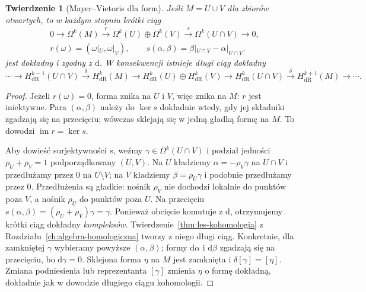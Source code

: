 \documentclass[11pt,a4paper,oneside]{report}
\newcommand{\dd}{\mathrm d}
\theoremstyle{plain}
\newtheorem{twierdzenie}{Twierdzenie}[section]
\theoremstyle{definition}
\theoremstyle{remark}
\begin{document}
\begin{twierdzenie}[Mayer--Vietoris dla form]
\label{thm:mv-de-rham}
Jeśli $M=U\cup V$ dla zbiorów otwartych, to
w każdym stopniu krótki ciąg
\begin{equation}\label{eq:mv-formy-kompleks}
\begin{gathered}
0\to\Omega^k(M)\xrightarrow{\ r\ }
\Omega^k(U)\oplus\Omega^k(V)
\xrightarrow{\ s\ }\Omega^k(U\cap V)\to0,\\
r(\omega)=(\omega|_U,\omega|_V),\qquad
s(\alpha,\beta)=\beta|_{U\cap V}-\alpha|_{U\cap V}.
\end{gathered}
\end{equation}
jest dokładny i zgodny z $\dd$. W konsekwencji
istnieje długi ciąg dokładny
\[
 \cdots\to H^{k-1}_{\mathrm{dR}}(U\cap V)
 \xrightarrow{\delta}H^k_{\mathrm{dR}}(M)
 \to H^k_{\mathrm{dR}}(U)\oplus H^k_{\mathrm{dR}}(V)
 \to H^k_{\mathrm{dR}}(U\cap V)
 \xrightarrow{\delta}H^{k+1}_{\mathrm{dR}}(M)\to\cdots.
\]
\end{twierdzenie}
\begin{proof}
Jeżeli $r(\omega)=0$, forma znika na $U$ i $V$,
więc znika na $M$: $r$ jest iniektywne.
Para $(\alpha,\beta)$ należy do $\ker s$ dokładnie
wtedy, gdy jej składniki zgadzają się na przecięciu;
wówczas sklejają się w jedną gładką formę na $M$.
To dowodzi $\operatorname{im}r=\ker s$.

Aby dowieść surjektywności $s$, weźmy
$\gamma\in\Omega^k(U\cap V)$ i podział jedności
$\rho_U+\rho_V=1$ podporządkowany $(U,V)$.
Na $U$ kładziemy $\alpha=-\rho_V\gamma$ na
$U\cap V$ i przedłużamy przez $0$ na $U\setminus V$;
na $V$ kładziemy $\beta=\rho_U\gamma$
i podobnie przedłużamy przez $0$.
Przedłużenia są gładkie: nośnik $\rho_V$ nie
dochodzi lokalnie do punktów poza $V$, a nośnik
$\rho_U$ do punktów poza $U$. Na przecięciu
$s(\alpha,\beta)=(\rho_U+\rho_V)\gamma=\gamma$.
Ponieważ obcięcie komutuje z $\dd$, otrzymujemy
krótki ciąg dokładny \emph{kompleksów}.
Twierdzenie~\ref{thm:les-kohomologia} z
Rozdziału~\ref{ch:algebra-homologiczna} tworzy
z niego długi ciąg. Konkretnie, dla zamkniętej
$\gamma$ wybieramy powyższe $(\alpha,\beta)$;
formy $\dd\alpha$ i $\dd\beta$ zgadzają się
na przecięciu, bo $\dd\gamma=0$. Sklejona
forma $\eta$ na $M$ jest zamknięta i
$\delta[\gamma]=[\eta]$. Zmiana podniesienia
lub reprezentanta $[\gamma]$ zmienia $\eta$
o formę dokładną, dokładnie jak w dowodzie
długiego ciągu kohomologii.
\end{proof}
\end{document}
